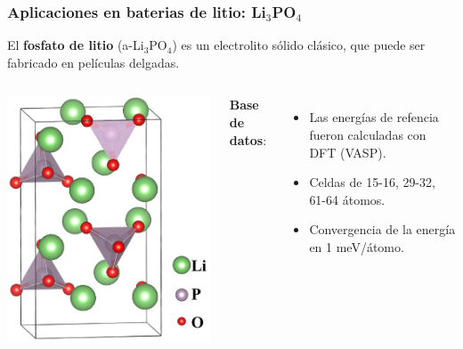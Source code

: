 \documentclass[aspectratio=169]{beamer}
\let\oldtextbf\textbf
\renewcommand{\textbf}[1]{\textcolor{nordblue}{\oldtextbf{#1}}}
\begin{document}
    \begin{frame}
        \frametitle{Aplicaciones en baterias de litio: Li$_3$PO$_4$}
            
        El \textbf{fosfato de litio} (a-Li$_3$PO$_4$) es un electrolito sólido 
        clásico, que puede ser fabricado en películas delgadas.
            
        \begin{columns}
            \begin{center}
                \includegraphics[width=\columnwidth]{Li3PO4-estructura.png}
            \end{center}
        
            \pause 

            \textbf{Base de datos}:
            \begin{itemize}
                \item Las energías de refencia fueron calculadas con DFT (VASP).
                \item Celdas de 15-16, 29-32, 61-64 átomos.
                \item Convergencia de la energía en 1 meV/átomo.


\end{itemize}
\end{columns}
\end{frame}
\end{document}
